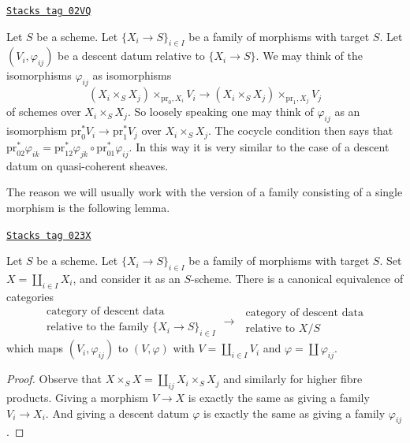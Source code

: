 \begin{remark}
\label{descent-remark-easier-family}
\href{https://stacks.math.columbia.edu/tag/02VQ}{\texttt{Stacks tag 02VQ}}

Let $S$ be a scheme.
Let $\{X_i \to S\}_{i \in I}$ be a family of morphisms with target $S$.
Let $(V_i, \varphi_{ij})$ be a descent datum relative to
$\{X_i \to S\}$. We may think of the isomorphisms $\varphi_{ij}$
as isomorphisms
$$
(X_i \times_S X_j) \times_{\text{pr}_0, X_i} V_i
\longrightarrow
(X_i \times_S X_j) \times_{\text{pr}_1, X_j} V_j
$$
of schemes over $X_i \times_S X_j$. So loosely speaking one may
think of $\varphi_{ij}$ as an isomorphism
$\text{pr}_0^*V_i \to \text{pr}_1^*V_j$ over $X_i \times_S X_j$.
The cocycle condition then says that
$\text{pr}_{02}^*\varphi_{ik} =
\text{pr}_{12}^*\varphi_{jk} \circ \text{pr}_{01}^*\varphi_{ij}$.
In this way it is very similar to the case of a descent datum on
quasi-coherent sheaves.
\end{remark}

The reason we will usually work with the version of a family consisting
of a single morphism is the following lemma.

\begin{lemma}
\label{descent-lemma-family-is-one}
\href{https://stacks.math.columbia.edu/tag/023X}{\texttt{Stacks tag 023X}}

Let $S$ be a scheme.
Let $\{X_i \to S\}_{i \in I}$ be a family of morphisms with target $S$.
Set $X = \coprod_{i \in I} X_i$, and consider it as an $S$-scheme.
There is a canonical equivalence of categories
$$
\begin{matrix}
\text{category of descent data } \\
\text{relative to the family } \{X_i \to S\}_{i \in I}
\end{matrix}
\longrightarrow
\begin{matrix}
\text{ category of descent data} \\
\text{ relative to } X/S
\end{matrix}
$$
which maps $(V_i, \varphi_{ij})$ to $(V, \varphi)$ with
$V = \coprod_{i\in I} V_i$ and $\varphi = \coprod \varphi_{ij}$.
\end{lemma}

\begin{proof}
Observe that $X \times_S X = \coprod_{ij} X_i \times_S X_j$
and similarly for higher fibre products.
Giving a morphism $V \to X$ is exactly the same as
giving a family $V_i \to X_i$. And giving a descent datum
$\varphi$ is exactly the same as giving a family $\varphi_{ij}$.
\end{proof}

